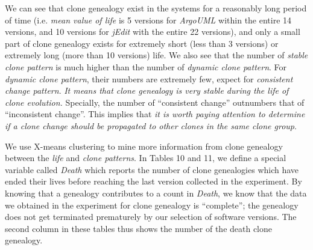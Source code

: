 We can see that clone genealogy exist in the systems for a reasonably long period of time (i.e.  {\em mean value of life} is 5 versions for {\em ArgoUML} within the entire 14 versions, and 10 versions for {\em jEdit} with the entire 22 versions), and only a small part of clone genealogy exists for extremely short (less than 3 versions) or extremely long (more than 10 versions) life. We also see that the number of {\em stable clone pattern} is much higher than the number of {\em dynamic clone pattern}. For {\em dynamic clone pattern}, their numbers are extremely few, expect for {\em consistent change pattern}. {\em It means that clone genealogy is very stable during the life of clone evolution.} Specially, the number of ``consistent change'' outnumbers that of ``inconsistent change''. This implies that {\em it is worth paying attention to determine if a clone change should be propagated to other clones in the same clone group}. 

We use X-means clustering to mine more information from clone genealogy between the {\em life} and {\em clone patterns}. In Tables 10 and 11, we define a special variable called {\em Death} which reports the number of clone genealogies which have ended their lives before reaching the last version collected in the experiment. By knowing that a genealogy contributes to a count in {\em Death}, we know that the data we obtained in the experiment for clone genealogy is ``complete''; the genealogy does not get terminated prematurely by our selection of software versions.  The second column in these tables thus shows the number of the death clone genealogy. 

